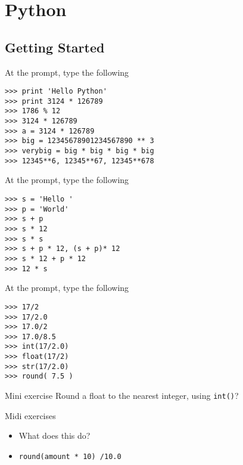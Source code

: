 \documentclass[14pt,compress]{beamer}
\begin{document}

\section{Python}

\subsection{Getting Started}

\begin{frame}[fragile]{At the prompt, type the following}
   \begin{lstlisting}
>>> print 'Hello Python' 
>>> print 3124 * 126789
>>> 1786 % 12
>>> 3124 * 126789
>>> a = 3124 * 126789
>>> big = 12345678901234567890 ** 3
>>> verybig = big * big * big * big 
>>> 12345**6, 12345**67, 12345**678
  \end{lstlisting}
\end{frame}

\begin{frame}[fragile]{At the prompt, type the following}
   \begin{lstlisting}
>>> s = 'Hello '
>>> p = 'World'
>>> s + p 
>>> s * 12 
>>> s * s
>>> s + p * 12, (s + p)* 12
>>> s * 12 + p * 12
>>> 12 * s 
    \end{lstlisting}
\end{frame}

\begin{frame}[fragile]{At the prompt, type the following}
  \begin{lstlisting}
>>> 17/2
>>> 17/2.0
>>> 17.0/2
>>> 17.0/8.5
>>> int(17/2.0)
>>> float(17/2)
>>> str(17/2.0)
>>> round( 7.5 )
  \end{lstlisting}
  \begin{block}{Mini exercise}
	Round a float to the nearest integer, using \texttt{int()}?
  \end{block}
\end{frame}

\begin{frame}{Midi exercises}
  \begin{center}
    \begin{itemize}
      \item What does this do?
      \item \texttt{round(amount * 10) /10.0 }
    \end{itemize}
  \end{center}
\end{frame}
\end{document}
